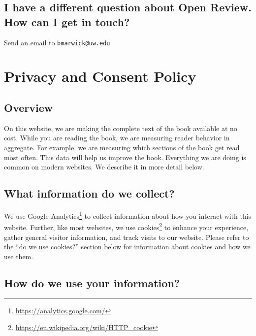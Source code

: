 \documentclass[12pt,]{krantz}
\renewcommand{\href}[2]{#2\footnote{\url{#1}}}
\theoremstyle{definition}
\theoremstyle{definition}
\theoremstyle{definition}
\theoremstyle{remark}
\begin{document}
\hypertarget{i-have-a-different-question-about-open-review.-how-can-i-get-in-touch}{%
\subsection*{I have a different question about Open Review. How can I
get in
touch?}\label{i-have-a-different-question-about-open-review.-how-can-i-get-in-touch}}

Send an email to \texttt{bmarwick@uw.edu}

\hypertarget{privacy-and-consent-policy}{%
\section*{Privacy and Consent Policy}\label{privacy-and-consent-policy}}


\hypertarget{overview}{%
\subsection*{Overview}\label{overview}}


On this website, we are making the complete text of the book available
at no cost. While you are reading the book, we are measuring reader
behavior in aggregate. For example, we are measuring which sections of
the book get read most often. This data will help us improve the book.
Everything we are doing is common on modern websites. We describe it in
more detail below.

\hypertarget{what-information-do-we-collect}{%
\subsection*{What information do we
collect?}\label{what-information-do-we-collect}}


We use \href{https://analytics.google.com/}{Google Analytics} to collect
information about how you interact with this website. Further, like most
websites, we use
\href{https://en.wikipedia.org/wiki/HTTP_cookie}{cookies} to enhance
your experience, gather general visitor information, and track visits to
our website. Please refer to the ``do we use cookies?'' section below
for information about cookies and how we use them.

\hypertarget{how-do-we-use-your-information}{%
\subsection*{How do we use your
information?}\label{how-do-we-use-your-information}}
\end{document}
